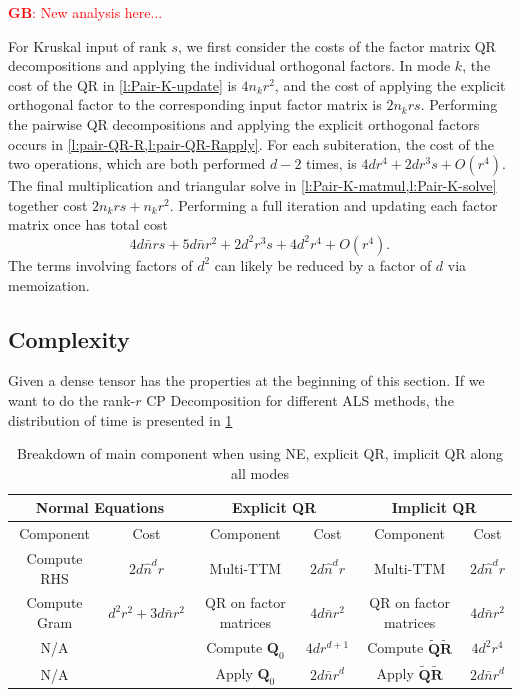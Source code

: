 \documentclass{article}
\newcommand{\mat}[1]{\mathbf{#1}}
\newcommand{\GB}[1]{\textcolor{red}{\textbf{GB}: #1}}
\begin{document}
\GB{New analysis here...}

For Kruskal input of rank $s$, we first consider the costs of the factor matrix QR decompositions and applying the individual orthogonal factors.
In mode $k$, the cost of the QR in \cref{l:Pair-K-update} is $4n_kr^2$, and the cost of applying the explicit orthogonal factor to the corresponding input factor matrix is $2n_krs$.
Performing the pairwise QR decompositions and applying the explicit orthogonal factors occurs in \cref{l:pair-QR-R,l:pair-QR-Rapply}.
For each subiteration, the cost of the two operations, which are both performed $d-2$ times, is $4dr^4+2dr^3s+O(r^4)$.
The final multiplication and triangular solve in \cref{l:Pair-K-matmul,l:Pair-K-solve} together cost $2n_krs+n_kr^2$.
Performing a full iteration and updating each factor matrix once has total cost
$$ 4d\bar{n}rs + 5d\bar{n}r^2 + 2d^2r^3s + 4d^2r^4 + O(r^4). $$
The terms involving factors of $d^2$ can likely be reduced by a factor of $d$ via memoization.

\subsection{Complexity}
Given a dense tensor has the properties at the beginning of this section. 
If we want to do the rank-$r$ CP Decomposition for different ALS methods, the distribution of time is presented in \cref{tab:dense_its_part}


\begin{table}[!ht] 
  \centering
  \begin{tabular}{|c|c|c|c|c|c|}
    \hline
    \multicolumn{2}{|c|}{\textbf{Normal Equations}} & \multicolumn{2}{|c|}{\textbf{Explicit QR}} & \multicolumn{2}{|c|}{\textbf{Implicit QR}} \\
    \hline
    Component & Cost & Component & Cost & Component & Cost \\
    \hline
    Compute RHS &$2d \hat{n}^d r$ &Multi-TTM &$2d\hat n^d r$  & Multi-TTM &$2d\hat n^d r$  \\
    Compute Gram & $d^2r^2 + 3d \bar{n} r^2$&QR on factor matrices & $4d \bar n r^2$ & QR on factor matrices & $4d \bar n r^2$\\
    N/A& &Compute $\mat{Q}_0$ & $4dr^{d+1}$& Compute $\tilde{\mat{Q}}\tilde{\mat{R}}$& $4d^2r^4$\\
    N/A & &Apply $\mat{Q}_0$& $2d\bar n r^d$& Apply $\tilde{\mat{Q}}\tilde{\mat{R}}$& $2d\bar n r^d$\\
    \hline
  \end{tabular}
  \caption{Breakdown of main component when using NE, explicit QR, implicit QR along all modes}
  \label{tab:dense_its_part}
\end{table}
\end{document}
